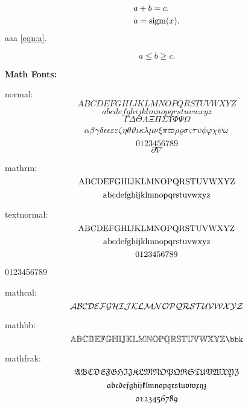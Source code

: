 \documentclass{article}
\begin{document}
\begin{align}
  & a + b = c. \\
  & a = \sigm(x).
  \label{eqn:a}
\end{align}
aaa \eqref{eqn:a}. \ie{} \eg{} \etc{} \etal

\[
  a \le b \ge c.
\]

\textbf{Math Fonts:}

normal:
\[ A B C D E F G H I J K L M N O P Q R S T U V W X Y Z \]
\[ a b c d e f g h i j k l m n o p q r s t u v w x y z \]
\[ \Gamma \Delta \Theta \Lambda \Xi \Pi \Sigma \Upsilon \Phi \Psi \Omega \]
\[ \alpha \beta \gamma \delta \epsilon \eps \varepsilon \veps \zeta \eta \theta \vartheta \iota \kappa \lambda \mu \nu \xi \pi \varpi \rho \varrho \sigma \varsigma \tau \upsilon \phi \varphi \chi \psi \omega \]
\[0123456789\]
\[ \partial \nabla \]

mathrm:
\[ \rmA \rmB \rmC \rmD \rmE \rmF \rmG \rmH \rmI \rmJ \rmK \rmL \rmM \rmN \rmO \rmP \rmQ \rmR \rmS \rmT \rmU \rmV \rmW \rmX \rmY \rmZ \]
\[ \rmaa \rmbb \rmcc \rmdd \rmee \rmff \rmgg \rmhh \rmii \rmjj \rmkk \rmll \rmmm \rmnn \rmoo \rmpp \rmqq \rmrr \rmss \rmtt \rmuu \rmvv \rmww \rmxx \rmyy \rmzz \]

textnormal:
\[ \tnA \tnB \tnC \tnD \tnE \tnF \tnG \tnH \tnI \tnJ \tnK \tnL \tnM \tnN \tnO \tnP \tnQ \tnR \tnS \tnT \tnU \tnV \tnW \tnX \tnY \tnZ \]
\[ \tnaa \tnbb \tncc \tndd \tnee \tnff \tngg \tnhh \tnii \tnjj \tnkk \tnll \tnmm \tnnn \tnoo \tnpp \tnqq \tnrr \tnss \tntt \tnuu \tnvv \tnww \tnxx \tnyy \tnzz \]
\[ \tnzro \tnone \tntwo \tnthr \tnfor \tnfiv \tnsix \tnsev \tneit \tnnin \]
\begin{center}
  0123456789
\end{center}

mathcal:
\[ \clA \clB \clC \clD \clE \clF \clG \clH \clI \clJ \clK \clL \clM \clN \clO \clP \clQ \clR \clS \clT \clU \clV \clW \clX \clY \clZ \]

mathbb:
\[ \bbA \bbB \bbC \bbD \bbE \bbF \bbG \bbH \bbI \bbJ \bbK \bbL \bbM \bbN \bbO \bbP \bbQ \bbR \bbS \bbT \bbU \bbV \bbW \bbX \bbY \bbZ \bbk \]

mathfrak:
\[ \frA \frB \frC \frD \frE \frF \frG \frH \frI \frJ \frK \frL \frM \frN \frO \frP \frQ \frR \frS \frT \frU \frV \frW \frX \frY \frZ \]
\[ \fraa \frbb \frcc \frdd \free \frff \frgg \frhh \frii \frjj \frkk \frll \frmm \frnn \froo \frpp \frqq \frrr \frss \frtt \fruu \frvv \frww \frxx \fryy \frzz \]
\[ \frzro \frone \frtwo \frthr \frfor \frfiv \frsix \frsev \freit \frnin \]
\end{document}
